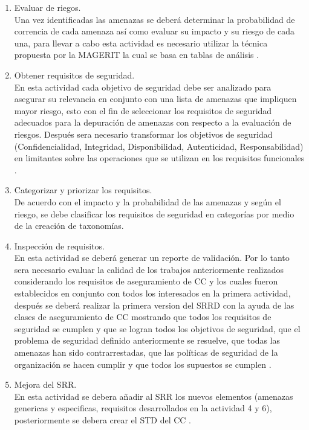 \documentclass[runningheads,a4paper]{llncs}
\begin{document}
\begin{enumerate}
	\item Evaluar de riegos.\\
	
	Una vez identificadas las amenazas se deberá determinar la probabilidad de correncia de cada amenaza así como evaluar su impacto y su riesgo de cada una, para llevar a cabo esta actividad es necesario utilizar la técnica propuesta por la \gls{MAGERIT} la cual se basa en tablas de análisis \cite{SREPMap}.\\
	
	\item Obtener requisitos de seguridad.\\
	
	En esta actividad cada objetivo de seguridad debe ser analizado para asegurar su relevancia en conjunto con una lista de amenazas que impliquen mayor riesgo, esto con el fin de seleccionar los requisitos de seguridad adecuados para la depuración de amenazas con respecto a la evaluación de riesgos. Después sera necesario transformar los objetivos de seguridad (Confidencialidad, Integridad, Disponibilidad, Autenticidad, Responsabilidad) en limitantes sobre las operaciones que se utilizan en los requisitos funcionales  \cite{SREPMellado}.\\
	
	\item Categorizar y priorizar los requisitos.\\
	
	De acuerdo con el impacto y la probabilidad de las amenazas y según el riesgo, se debe clasificar los requisitos de seguridad en categorías por medio de la creación de taxonomías.\\
	
	\item Inspección de requisitos.\\
	
	En esta actividad se deberá generar un reporte de validación. Por lo tanto sera necesario evaluar la calidad de los trabajos anteriormente realizados considerando los requisitos de aseguramiento de \gls{CC} y los cuales fueron establecidos en conjunto con todos los interesados en la primera actividad, después se deberá realizar la primera version del \gls{SRRD} con la ayuda de las clases de aseguramiento de \gls{CC} mostrando que todos los requisitos de seguridad se cumplen y que se logran todos los objetivos de seguridad, que el problema de seguridad definido anteriormente se resuelve, que todas las amenazas han sido
contrarrestadas, que las políticas de seguridad de la organización se hacen cumplir y que todos los supuestos
se cumplen \cite{SREPMellado}.\\
	
	\item Mejora del \gls{SRR}.\\
	
	En esta actividad se debera añadir al \gls{SRR} los nuevos elementos (amenazas genericas y especificas, requisitos desarrollados en la actividad 4 y 6), posteriormente se debera crear el \gls{STD} del \gls{CC} \cite{SREPMellado}.	
	
\end{enumerate}
\end{document}
